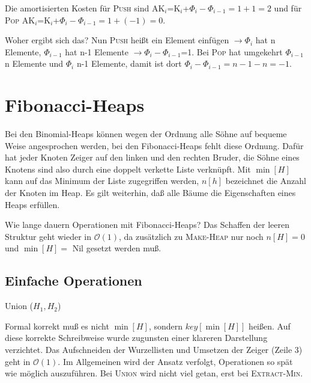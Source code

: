 \documentclass[ngerman,draft,parskip=half*,twoside]{scrreprt}
\theoremstyle{break}
\theoremstyle{nonumberbreak}
\newcommand*{\OO}{\mathcal{O}}      %
\begin{document}
Die amortisierten Kosten für  \textsc{Push} sind AK$_i$=K$_i$+${\Phi}_i-{\Phi}_{i-1}=1+1=2$
und für  \textsc{Pop} AK$_i$=K$_i$+${\Phi}_i-{\Phi}_{i-1}=1+(-1)=0$.

Woher ergibt sich das? Nun \textsc{Push} heißt ein Element einfügen $\rightarrow {\Phi}_i$ hat n Elemente,
${\Phi}_{i-1}$
 hat n-1 Elemente $ \rightarrow {\Phi}_i-{\Phi}_{i-1}$=1. Bei \textsc{Pop} hat umgekehrt ${\Phi}_{i-1}$ n Elemente und
 ${\Phi}_i $ n-1
Elemente, damit ist dort ${\Phi}_i-{\Phi}_{i-1}=n-1-n=-1$.  

\section{Fibonacci-Heaps}
Bei den Binomial-Heaps können wegen der Ordnung alle Söhne auf bequeme Weise angesprochen werden, bei den
Fibonacci-Heaps fehlt diese Ordnung. Dafür hat jeder Knoten Zeiger auf den linken und den rechten Bruder, die Söhne
eines Knotens sind also durch eine doppelt verkette Liste verknüpft. Mit $\min[H]$ kann auf das Minimum der Liste
zugegriffen werden, $n[h]$ bezeichnet die Anzahl der Knoten im Heap. Es gilt weiterhin, daß alle Bäume die
Eigenschaften eines Heaps erfüllen.

Wie lange dauern Operationen mit Fibonacci-Heaps? Das Schaffen der leeren Struktur geht wieder in $\OO(1)$, da zusätzlich
zu \textsc{Make-Heap} nur noch $n[H]=0$ und $\min[H]=$ Nil gesetzt werden muß.

\subsection{Einfache Operationen}

\begin{algorithm}
\caption{Union ($H_{1}, H_{2}$)}
\end{algorithm}
Formal korrekt muß es nicht $\min[H]$, sondern $key[\min[H]]$ heißen. Auf diese korrekte Schreibweise wurde
zugunsten einer klareren Darstellung verzichtet.
Das Aufschneiden der Wurzellisten und Umsetzen der Zeiger (Zeile 3) geht in $\OO(1)$. Im Allgemeinen wird der Ansatz
verfolgt, Operationen so spät wie möglich auszuführen. Bei \textsc{Union} wird nicht viel getan, erst bei
\textsc{Extract-Min}.
\end{document}
